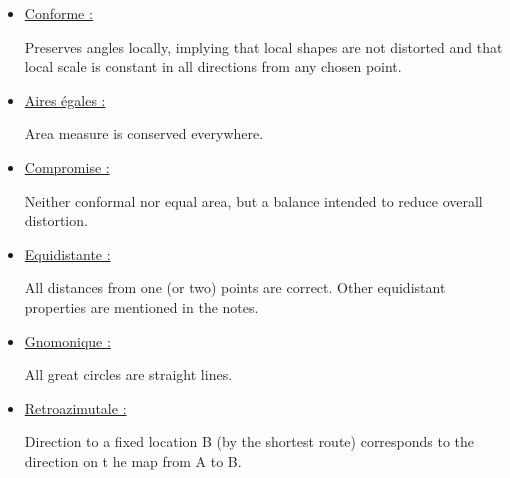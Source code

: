 \documentclass{article}
\begin{document}
\begin{itemize}
    \item \underline{Conforme :}
        \begin{itemize} Preserves angles locally, implying that local shapes are not 
        distorted and that local scale 
        is constant in all directions from any chosen point.
        \end{itemize}
    \item \underline{Aires égales :}
        \begin{itemize}Area measure is conserved everywhere.
        \end{itemize}
    \item \underline{Compromise :}
        \begin{itemize}Neither conformal nor equal
        area, but a balance intended to reduce overall distortion.
        \end{itemize}
    \item \underline{Equidistante :}
        \begin{itemize} All 
        distances from one (or two) points are correct. Other equidistant properties are 
        mentioned in the notes.
        \end{itemize}
    \item \underline{Gnomonique :}
        \begin{itemize} All great circles are straight lines.
        \end{itemize}
    \item \underline{Retroazimutale :}
        \begin{itemize} Direction to a fixed location B (by the shortest route) corresponds to the direction on t
        he 
        map from A to B.
        \end{itemize}
\end{itemize}
\end{document}
